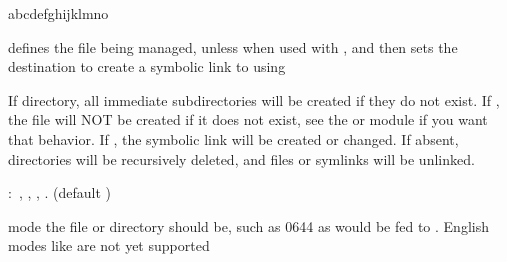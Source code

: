 


\begin{xlist}{abcdefghijklmno}
  \item[\man\,\C{dest}]
	defines the file being managed, unless when used with , and then sets the destination to create a symbolic link to using  
		
		\item[\opt\,\C{state}]
	If directory, all immediate subdirectories will be created if they do not exist. If , the file will NOT be created if it does not exist, see the  or  module if you want that behavior. If , the symbolic link will be created or changed. If absent, directories will be recursively deleted, and files or symlinks will be unlinked. 
		
		:\,
		    ,
		    ,
		    ,
		    .
		    (default )
		\item[\opt\,\C{mode}]
	mode the file or directory should be, such as 0644 as would be fed to . English modes like  are not yet supported 
		
		\end{xlist}
		



